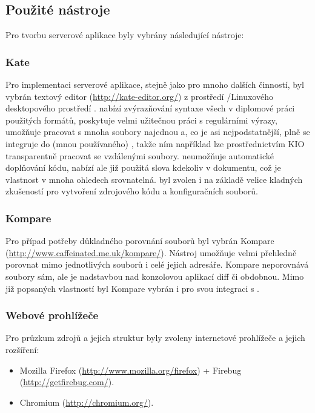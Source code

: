 \subsection{Použité nástroje}
\label{sec:server:tools}
Pro tvorbu serverové aplikace byly vybrány následující nástroje:
\subsubsection{Kate}
\label{sec:server:tools:kate}
Pro implementaci serverové aplikace, stejně jako pro mnoho dalších činností, byl vybrán textový editor  (\url{http://kate-editor.org/}) z prostředí /Linuxového desktopového prostředí .  nabízí zvýrazňování syntaxe všech v diplomové práci použitých formátů, poskytuje velmi užitečnou práci s regulárními výrazy, umožňuje pracovat s mnoha soubory najednou a, co je asi nejpodstatnější, plně se integruje do (mnou používaného) , takže ním například lze prostřednictvím \gls{KIO} transparentně pracovat se vzdálenými soubory.  neumožňuje automatické doplňování kódu, nabízí ale již použitá slova kdekoliv v dokumentu, což je vlastnost v mnoha ohledech srovnatelná.  byl zvolen i na základě velice kladných zkušeností pro vytvoření zdrojového kódu a konfiguračních souborů.

\subsubsection{Kompare}
\label{sec:server:tools:kompare}
Pro případ potřeby důkladného porovnání souborů byl vybrán Kompare (\url{http://www.caffeinated.me.uk/kompare/}). Nástroj umožňuje velmi přehledně porovnat mimo jednotlivých souborů i celé jejich adresáře. Kompare neporovnává soubory sám, ale je nadstavbou nad konzolovou aplikací diff či obdobnou. Mimo již popsaných vlastností byl Kompare vybrán i pro svou integraci s .

\subsubsection{Webové prohlížeče}
Pro průzkum zdrojů a jejich struktur byly zvoleny internetové prohlížeče a jejich rozšíření:
\begin{itemize}
 \item Mozilla Firefox (\url{http://www.mozilla.org/firefox}) + Firebug (\url{http://getfirebug.com/}).
 \item Chromium (\url{http://chromium.org/}).
\end{itemize}

